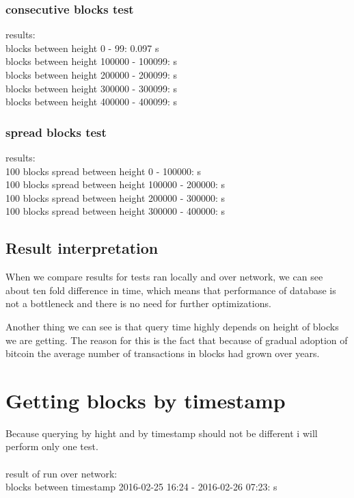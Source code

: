 \documentclass[12pt, en, eng, oneside]{mgr}
\begin{document}
\subsubsection{consecutive blocks test}
results:
\\
blocks between height 0 - 99: \quad \quad \quad \hspace*{2em} 0.097 s\\
blocks between height 100000 - 100099:  s\\
blocks between height 200000 - 200099:  s\\
blocks between height 300000 - 300099:  s\\
blocks between height 400000 - 400099:  s\\

\subsubsection{spread blocks test}
results:
\\
100 blocks spread between height 0 - 100000: \quad \quad {} s\\
100 blocks spread between height 100000 - 200000:  s\\
100 blocks spread between height 200000 - 300000:  s\\
100 blocks spread between height 300000 - 400000:  s\\

\subsection{Result interpretation}
When we compare results for tests ran locally and over network, we can see about ten fold difference in time, which means that performance of database is not a bottleneck and there is no need for further optimizations.

Another thing we can see is that query time highly depends on height of blocks we are getting. The reason for this is the fact that because of gradual adoption of bitcoin the average number of transactions in blocks had grown over years. 

\section{Getting blocks by timestamp}
Because querying by hight and by timestamp should not be different i will perform only one test.
\\
\\
result of run over network:
\\
blocks between timestamp 2016-02-25 16:24 - 2016-02-26 07:23:  s
\end{document}
